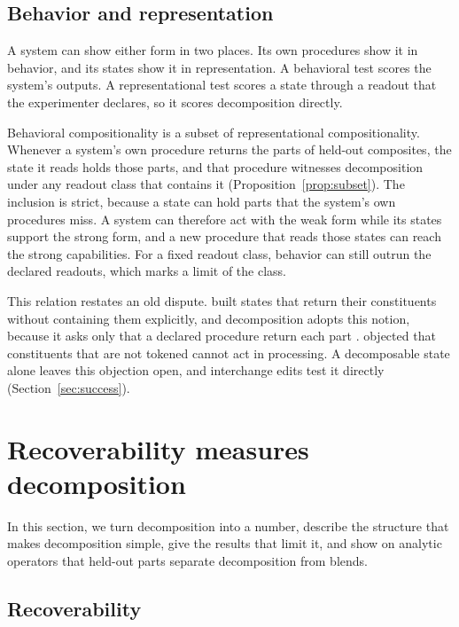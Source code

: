 \subsection{Behavior and representation}
\label{sec:subset}

A system can show either form in two places. Its own procedures show it in behavior, and its states show it in representation. A behavioral test scores the system's outputs. A representational test scores a state through a readout that the experimenter declares, so it scores decomposition directly.

Behavioral compositionality is a subset of representational compositionality. Whenever a system's own procedure returns the parts of held-out composites, the state it reads holds those parts, and that procedure witnesses decomposition under any readout class that contains it (Proposition~\ref{prop:subset}). The inclusion is strict, because a state can hold parts that the system's own procedures miss. A system can therefore act with the weak form while its states support the strong form, and a new procedure that reads those states can reach the strong capabilities. For a fixed readout class, behavior can still outrun the declared readouts, which marks a limit of the class.

This relation restates an old dispute. \citet{smolensky1990} built states that return their constituents without containing them explicitly, and decomposition adopts this notion, because it asks only that a declared procedure return each part \citep[cf.][]{vangelder1990}. \citet{fodor1990} objected that constituents that are not tokened cannot act in processing. A decomposable state alone leaves this objection open, and interchange edits test it directly (Section~\ref{sec:success}).

\section{Recoverability measures decomposition}
\label{sec:repcomp}

In this section, we turn decomposition into a number, describe the structure that makes decomposition simple, give the results that limit it, and show on analytic operators that held-out parts separate decomposition from blends.

\subsection{Recoverability}

